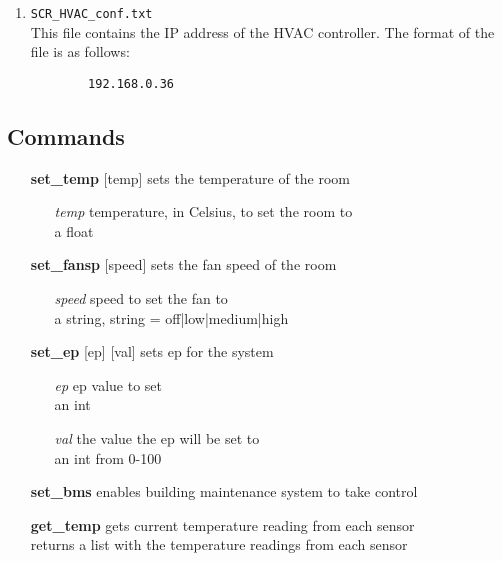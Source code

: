 \documentclass[twoside]{article}
\begin{document}
	\begin{enumerate}
		\item \verb|SCR_HVAC_conf.txt|\\
		This file contains the IP address of the HVAC controller. The format of the file is as follows:
		
		\begin{verbatim}
		192.168.0.36
		\end{verbatim}
		
	\end{enumerate}
	
	\subsection{Commands}
	
	\begin{enumerate}
		
		\item[\bf set\_temp] [temp]
		sets the temperature of the room	
		\begin{enumerate}[leftmargin=3\parindent]
			\item[\it temp] temperature, in Celsius, to set the room to\\
			a float
		\end{enumerate}
		
		\item[\bf set\_fansp] [speed]
		sets the fan speed of the room
		\begin{enumerate}[leftmargin=3\parindent]
			\item[\it speed] speed to set the fan to\\ 
			a string, string = off|low|medium|high
		\end{enumerate}
		
		\item[\bf set\_ep] [ep] [val]
		sets ep for the system
		\begin{enumerate}[leftmargin=3\parindent]
			\item[\it ep] ep value to set\\ 
			an int
			\item[\it val] the value the ep will be set to\\ 
			an int from 0-100
		\end{enumerate}
		
		\item[\bf set\_bms]	enables building maintenance system to take control
		
		\item[\bf get\_temp] gets current temperature reading from each sensor \\
		returns a list with the temperature readings from each sensor
		

\end{enumerate}
\end{document}
